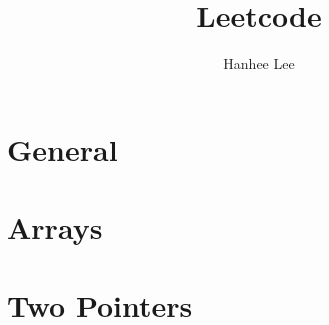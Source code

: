 \documentclass{article}
\title{Leetcode}
\author{Hanhee Lee}
\begin{document}
\section{General}

\newpage

\section{Arrays}

\newpage

\section{Two Pointers}

\newpage
\end{document}
